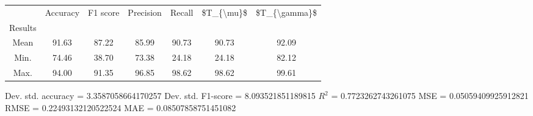 \begin{tabular}{|c|c|c|c|c|c|c|}
\toprule
{} &  Accuracy &  F1 score &  Precision &  Recall &  \$T\_\{\textbackslash mu\}\$ &  \$T\_\{\textbackslash gamma\}\$ \\
Results &           &           &            &         &            &               \\
\hline
Mean    &     91.63 &     87.22 &      85.99 &   90.73 &      90.73 &         92.09 \\
Min.    &     74.46 &     38.70 &      73.38 &   24.18 &      24.18 &         82.12 \\
Max.    &     94.00 &     91.35 &      96.85 &   98.62 &      98.62 &         99.61 \\
\bottomrule
\end{tabular}

 Dev. std. accuracy = 3.3587058664170257
 Dev. std. F1-score = 8.093521851189815
 $R^2$ = 0.7723262743261075
 MSE = 0.05059409925912821
 RMSE = 0.22493132120522524
 MAE = 0.08507858751451082